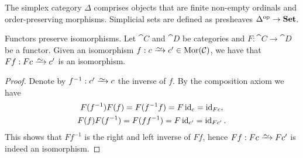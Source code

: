 \begin{example}
\label{exp:simplex-category}
The simplex category \(\Delta\) comprises objects that are finite non-empty
ordinals and order-preserving morphisms. Simplicial sets are defined as
presheaves \(\Delta^{\mathrm{op}} \to {\textbf{Set}}\).
\end{example}

\begin{lemma}\label{lem: functor preserve iso}
Functors preserve isomorphisms. Let \(\cat C\) and \(\cat D\) be categories
and \(F: \cat C \to \cat D\) be a functor. Given an isomorphism \(f: c \isoto
c' \in \Mor(\cat C)\), we have that \(F f : F c \isoto c'\) is an isomorphism.
\end{lemma}

\begin{proof}
Denote by \(f^{-1}: c' \isoto c\) the inverse of \(f\). By the composition
axiom we have
\begin{gather*}
  F (f^{-1}) F (f) = F (f^{-1} f) = F \operatorname{id}_c    = \operatorname{id}_{F c}, \\
  F (f) F (f^{-1}) = F (f f^{-1}) = F \operatorname{id}_{c'} = \operatorname{id}_{F c'}.
\end{gather*}
This shows that \(F f^{-1}\) is the right and left inverse of \(F f\), hence
\(F f: F c \isoto F c'\) is indeed an isomorphism.
\end{proof}

